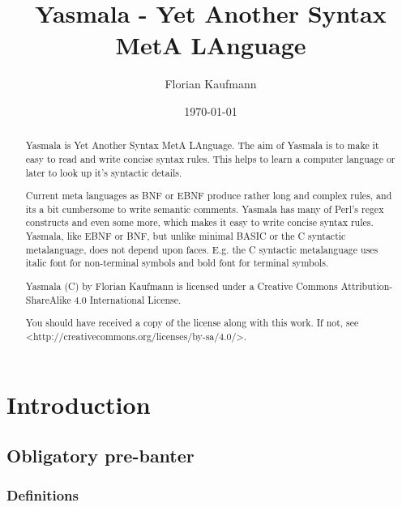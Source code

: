 \documentclass[a4paper]{report}
\begin{document}
\author{Florian Kaufmann}
\title{Yasmala - Yet Another Syntax MetA LAnguage}
\date{\today}
\maketitle

\begin{abstract}
Yasmala is Yet Another Syntax MetA LAnguage. The aim of Yasmala is to make it
easy to read and write concise syntax rules. This helps to learn a computer
language or later to look up it's syntactic details.

Current meta languages as BNF or EBNF produce rather long and complex rules, and
its a bit cumbersome to write semantic comments. Yasmala has many of Perl's
regex constructs and even some more, which makes it easy to write concise syntax
rules. Yasmala, like EBNF or BNF, but unlike minimal BASIC or the C syntactic
metalanguage, does not depend upon faces. E.g. the C syntactic metalanguage uses
italic font for non-terminal symbols and bold font for terminal symbols.

Yasmala (C) by Florian Kaufmann is licensed under a Creative Commons
Attribution-ShareAlike 4.0 International License.

You should have received a copy of the license along with this work. If not,
see <http://creativecommons.org/licenses/by-sa/4.0/>.
\end{abstract}

\tableofcontents

\chapter{Introduction}

\section{Obligatory pre-banter}

\subsection{Definitions}
\end{document}
